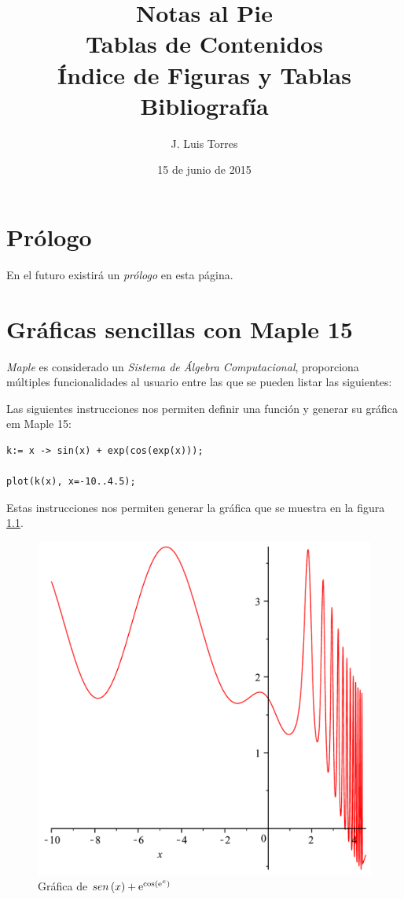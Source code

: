 \documentclass[letterpaper,12pt]{book}
\title{Notas al Pie \\ 
	\vspace{1cm}Tablas de Contenidos \\ 
	\vspace{1cm}Índice de Figuras y Tablas\\
	\vspace{1cm}Bibliografía}
\author{J. Luis Torres}
\date{15 de junio de 2015}
\begin{document}
\maketitle

\tableofcontents

\listoffigures

\listoftables

\chapter*{Prólogo}

En el futuro existirá un \emph{prólogo} en esta página.

\chapter{Gráficas sencillas con Maple 15}

\emph{Maple} es considerado un \emph{Sistema de Álgebra Computacional}, proporciona múltiples
funcionalidades al usuario entre las que se pueden listar las siguientes:

Las siguientes instrucciones nos permiten definir una función y generar su gráfica 
em Maple 15:

\begin{verbatim}
k:= x -> sin(x) + exp(cos(exp(x)));

plot(k(x), x=-10..4.5);
\end{verbatim}

Estas instrucciones nos permiten generar la gráfica que se muestra en la figura \ref{cap1f1}.

\begin{figure}[h!]
\centering
\includegraphics[scale=0.45]{grafica01.pdf}
\caption{Gráfica de $sen \left( x \right) +{{\rm e}^{\cos \left( {{\rm e}^{x}} \right) }}$}\label{cap1f1}
\end{figure}
\end{document}
